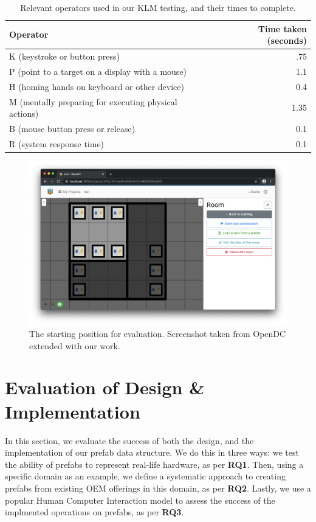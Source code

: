 \documentclass[11pt]{article}
\begin{document}
\newpage

\begin{table}[]
\centering
	\begin{tabular}{lr}
	\toprule
	Operator                                              & Time taken (seconds) \\ \midrule
	K (keystroke or button press)                         & .75                  \\
	P (point to a target on a display with a mouse)       & 1.1                  \\
	H (homing hands on keyboard or other device)          & 0.4                  \\
	M (mentally preparing for executing physical actions) & 1.35                 \\
	B (mouse button press or release)                     & 0.1                  \\
	R (system response time)							  &	   0.1                  \\
	\bottomrule
	\end{tabular}
\caption{Relevant operators used in our KLM testing, and their times to complete.}
\label{tab:3}
\end{table}

\begin{figure}[]
	\centering
	\includegraphics[width=\textwidth]{frontendstartingpoint.png}
	\caption[The starting position for evaluation]{The starting position for evaluation. Screenshot taken from OpenDC extended with our work.}
	\label{fig:evalstart}
\end{figure}

\section{Evaluation of Design \& Implementation} \label{sec:evaluation}
	In this section, we evaluate the success of both the design, and the implementation of our prefab data structure.
	We do this in three ways: we test the ability of prefabs to represent real-life hardware, as per \textbf{RQ1}.
	Then, using a specific domain as an example, we define a systematic approach to creating prefabs from existing OEM offerings in this domain, as per \textbf{RQ2}.
	Lastly, we use a popular Human Computer Interaction model to assess the success of the implmented operations on prefabs, as per \textbf{RQ3}.
\end{document}
